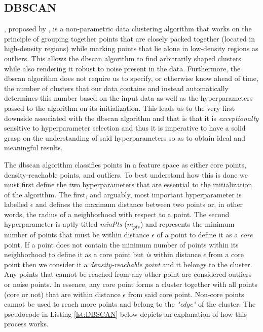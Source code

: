 \subsection{DBSCAN}
\label{subsec:Background-Information:Clustering-Algorithms:DBSCAN}
, proposed by \citet{Ester}, is a non-parametric data clustering algorithm that works on the principle of grouping together points that are closely packed together (\ie located in high-density regions) while marking points that lie alone in low-density regions as outliers. This allows the \gls{dbscan} algorithm to find arbitrarily shaped clusters while also rendering it robust to noise present in the data. Furthermore, the \gls{dbscan} algorithm does not require us to specify, or otherwise know ahead of time, the number of clusters that our data contains and instead automatically determines this number based on the input data as well as the hyperparameters passed to the algorithm on its initialization. This leads us to the very first downside associated with the \gls{dbscan} algorithm and that is that it is \textit{exceptionally} sensitive to hyperparameter selection and thus it is imperative to have a solid grasp on the understanding of said hyperparameters so as to obtain ideal and meaningful results.

\noindent \newline The \gls{dbscan} algorithm classifies points in a feature space as either core points, density-reachable points, and outliers. To best understand how this is done we must first define the two hyperparameters that are essential to the initialization of the algorithm. The first, and arguably, most important hyperparameter is labelled $\epsilon$ and defines the maximum distance between two points or, in other words, the radius of a neighborhood with respect to a point. The second hyperparameter is aptly titled \textit{minPts} ($m_{pts}$) and represents the minimum number of points that must be within distance $\epsilon$ of a point to define it as a \textit{core} point. If a point does not contain the minimum number of points within its neighborhood to define it as a core point but \textit{is} within distance $\epsilon$ from a core point then we consider it a \textit{density-reachable point} and it belongs to the cluster. Any points that cannot be reached from any other point are considered outliers or noise points. In essence, any core point forms a cluster together with all points (core or not) that are within distance $\epsilon$ from said core point. Non-core points cannot be used to reach more points and belong to the \textit{"edge"} of the cluster. The pseudocode in Listing \ref{lst:DBSCAN} below depicts an explanation of how this process works.

